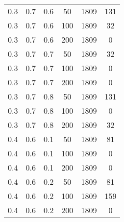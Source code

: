 \begin{table}[h]
\begin{center}
\begin{threeparttable}
\begin{tabular}{|c|c|c|c|c|c|}
	   \hline
		0.3 &  0.7 &  0.6 &   50 &  1809 &   131 \\
		0.3 &  0.7 &  0.6 &  100 &  1809 &    32 \\
		0.3 &  0.7 &  0.6 &  200 &  1809 &     0 \\
	   \hline
		0.3 &  0.7 &  0.7 &   50 &  1809 &    32 \\
		0.3 &  0.7 &  0.7 &  100 &  1809 &     0 \\
		0.3 &  0.7 &  0.7 &  200 &  1809 &     0 \\
	   \hline
		0.3 &  0.7 &  0.8 &   50 &  1809 &   131 \\
		0.3 &  0.7 &  0.8 &  100 &  1809 &     0 \\
		0.3 &  0.7 &  0.8 &  200 &  1809 &    32 \\
	   \hline
		0.4 &  0.6 &  0.1 &   50 &  1809 &    81 \\
		0.4 &  0.6 &  0.1 &  100 &  1809 &     0 \\
		0.4 &  0.6 &  0.1 &  200 &  1809 &     0 \\
	   \hline
		0.4 &  0.6 &  0.2 &   50 &  1809 &    81 \\
		0.4 &  0.6 &  0.2 &  100 &  1809 &   159 \\
		0.4 &  0.6 &  0.2 &  200 &  1809 &     0 \\
	   \hline
        		\end{tabular}
        \end{threeparttable}
	\end{center}
\end{table}
